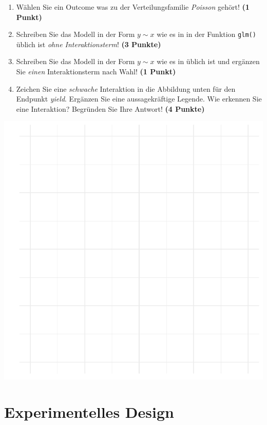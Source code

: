 \documentclass[a4paper, 9pt]{scrartcl}\usepackage[]{graphicx}\usepackage[]{xcolor}
\makeatletter
\def\maxwidth{ %
  \ifdim\Gin@nat@width>\linewidth
    \linewidth
  \else
    \Gin@nat@width
  \fi
}
\makeatother
\begin{document}
\begin{enumerate}
\item W{\"a}hlen Sie ein Outcome was zu der Verteilungsfamilie
  \textit{Poisson} geh{\"o}rt! \textbf{(1 Punkt)}
\item Schreiben Sie das Modell in der Form $y \sim x$ wie es in \Rlogo in
  der Funktion \texttt{glm()}
  {\"u}blich ist \textit{ohne Interaktionsterm}! \textbf{(3 Punkte)}
\item Schreiben Sie das Modell in der Form $y \sim x$ wie es in \Rlogo
  {\"u}blich ist und erg{\"a}nzen Sie \textit{einen} Interaktionsterm nach Wahl! \textbf{(1 Punkt)} 
\item Zeichen Sie eine \textit{schwache}
  Interaktion in die Abbildung unten f{\"u}r den Endpunkt
  \textit{yield}. Erg{\"a}nzen Sie eine aussagekr{\"a}ftige Legende. Wie erkennen
  Sie eine Interaktion? Begr{\"u}nden Sie Ihre Antwort! \textbf{(4 Punkte)}
\end{enumerate}



{\centering \includegraphics[width=\maxwidth]{img/modeling-R-01-1} 

}


 
\clearpage
\part{Experimentelles Design}
\end{document}
